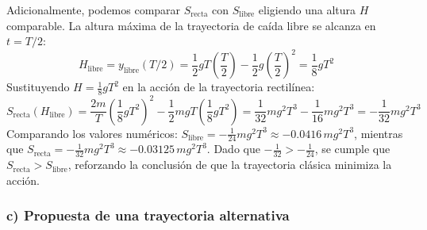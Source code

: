 \documentclass[a4paper]{article}
\begin{document}
Adicionalmente, podemos comparar $S_{\text{recta}}$ con $S_{\text{libre}}$ eligiendo una altura $H$ comparable. La altura máxima de la trayectoria de caída libre se alcanza en $t=T/2$:
$$H_{\text{libre}} = y_{\text{libre}}(T/2) = \frac{1}{2}gT\left(\frac{T}{2}\right) - \frac{1}{2}g\left(\frac{T}{2}\right)^2 = \frac{1}{8}gT^2$$
Sustituyendo $H = \frac{1}{8}gT^2$ en la acción de la trayectoria rectilínea:
$$S_{\text{recta}}(H_{\text{libre}}) = \frac{2m}{T}\left(\frac{1}{8}gT^2\right)^2 - \frac{1}{2}mgT\left(\frac{1}{8}gT^2\right) = \frac{1}{32}mg^2T^3 - \frac{1}{16}mg^2T^3 = -\frac{1}{32}mg^2T^3$$
Comparando los valores numéricos: $S_{\text{libre}} = -\frac{1}{24}mg^2T^3 \approx -0.0416 \, mg^2T^3$, mientras que $S_{\text{recta}} = -\frac{1}{32}mg^2T^3 \approx -0.03125 \, mg^2T^3$. 
Dado que $-\frac{1}{32} > -\frac{1}{24}$, se cumple que $S_{\text{recta}} > S_{\text{libre}}$, reforzando la conclusión de que la trayectoria clásica minimiza la acción.

\subsubsection*{c) Propuesta de una trayectoria alternativa}
\end{document}
